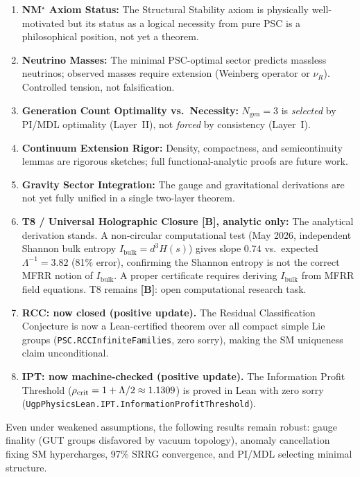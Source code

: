 \documentclass[11pt]{article}
\begin{document}
\begin{enumerate}[label=(\roman*)]
\item \textbf{NM$^\star$ Axiom Status:} The Structural Stability axiom is physically well-motivated but its status as a logical necessity from pure PSC is a philosophical position, not yet a theorem.
\item \textbf{Neutrino Masses:} The minimal PSC-optimal sector predicts massless neutrinos; observed masses require extension (Weinberg operator or $\nu_R$). Controlled tension, not falsification.
\item \textbf{Generation Count Optimality vs.\ Necessity:} $N_\mathrm{gen}=3$ is \emph{selected} by PI/MDL optimality (Layer~II), not \emph{forced} by consistency (Layer~I).
\item \textbf{Continuum Extension Rigor:} Density, compactness, and semicontinuity lemmas are rigorous sketches; full functional-analytic proofs are future work.
\item \textbf{Gravity Sector Integration:} The gauge and gravitational derivations are not yet fully unified in a single two-layer theorem.
\item \textbf{T8 / Universal Holographic Closure \textbf{[B]}, analytic only:} The analytical derivation stands.  A non-circular computational test (May 2026, independent Shannon bulk entropy $I_\mathrm{bulk} = d^3 H(s)$) gives slope $0.74$ vs.\ expected $\Lambda^{-1} = 3.82$ (81\% error), confirming the Shannon entropy is not the correct MFRR notion of $I_\mathrm{bulk}$.  A proper certificate requires deriving $I_\mathrm{bulk}$ from MFRR field equations.  T8 remains \textbf{[B]}: open computational research task.
\item \textbf{RCC: now closed (positive update).} The Residual Classification Conjecture is now a Lean-certified theorem over all compact simple Lie groups (\texttt{PSC.RCCInfiniteFamilies}, zero sorry), making the SM uniqueness claim unconditional.
\item \textbf{IPT: now machine-checked (positive update).} The Information Profit Threshold ($\rho_{\rm crit}=1+\Lambda/2\approx1.1309$) is proved in Lean with zero sorry (\texttt{UgpPhysicsLean.IPT.InformationProfitThreshold}).
\end{enumerate}

Even under weakened assumptions, the following results remain robust: gauge finality (GUT groups disfavored by vacuum topology), anomaly cancellation fixing SM hypercharges, 97\% SRRG convergence, and PI/MDL selecting minimal structure.
\end{document}
